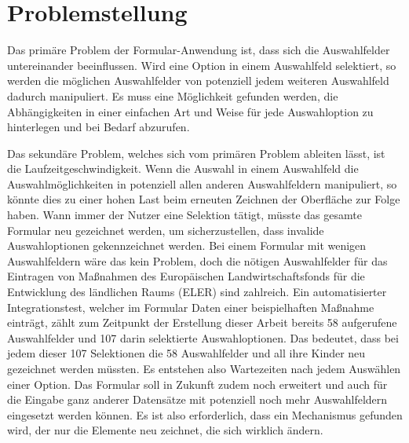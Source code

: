 
\section{Problemstellung}

Das primäre Problem der Formular-Anwendung ist, dass sich die Auswahlfelder untereinander beeinflussen.
Wird eine Option in einem Auswahlfeld selektiert, so werden die möglichen Auswahlfelder von potenziell jedem weiteren Auswahlfeld dadurch manipuliert.
Es muss eine Möglichkeit gefunden werden, die Abhängigkeiten in einer einfachen Art und Weise für jede Auswahloption zu hinterlegen und bei Bedarf abzurufen.


Das sekundäre Problem, welches sich vom primären Problem ableiten lässt, ist die  Laufzeitgeschwindigkeit. 
Wenn die Auswahl in einem Auswahlfeld die Auswahlmöglichkeiten in potenziell allen anderen Auswahlfeldern manipuliert, so könnte dies zu einer hohen Last beim erneuten Zeichnen der Oberfläche zur Folge haben.
Wann immer der Nutzer eine Selektion tätigt, müsste das gesamte Formular neu gezeichnet werden, um sicherzustellen, dass invalide Auswahloptionen gekennzeichnet werden.
Bei einem  Formular mit wenigen Auswahlfeldern wäre das kein Problem,
doch die nötigen Auswahlfelder für das Eintragen von Maßnahmen  des Europäischen Landwirtschaftsfonds für die Entwicklung des ländlichen Raums (ELER) sind zahlreich.
Ein  automatisierter Integrationstest, welcher im Formular Daten einer beispielhaften Maßnahme einträgt, zählt zum Zeitpunkt der Erstellung dieser Arbeit bereits 58 aufgerufene Auswahlfelder und 107 darin selektierte Auswahloptionen.
Das bedeutet, dass bei jedem dieser 107 Selektionen die 58 Auswahlfelder und all ihre Kinder neu gezeichnet werden müssten.
Es entstehen also Wartezeiten nach jedem Auswählen einer Option.
Das Formular soll in Zukunft zudem noch erweitert und auch für die Eingabe ganz anderer Datensätze mit potenziell noch mehr Auswahlfeldern eingesetzt werden können.
Es ist also erforderlich, dass ein Mechanismus gefunden wird,  der nur die Elemente neu zeichnet, die sich wirklich ändern.